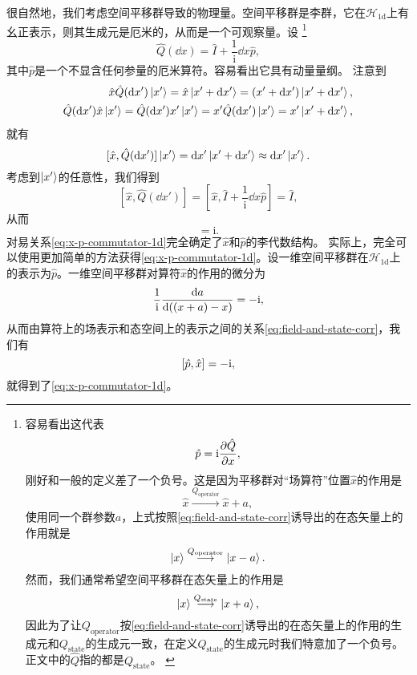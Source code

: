 \documentclass[hyperref, UTF8, a4paper]{ctexart}
\newcommand*{\ii}{\mathrm{i}}
\begin{document}
很自然地，我们考虑空间平移群导致的物理量。空间平移群是李群，它在$\mathcal{H}_{1\text{d}}$上有幺正表示，则其生成元是厄米的，从而是一个可观察量。设%
\footnote{容易看出这代表
\[
    \hat{p} = \ii \pdv{\hat{Q}}{x},
\]
刚好和一般的定义差了一个负号。这是因为平移群对“场算符”位置$\hat{x}$的作用是
\[
    \hat{x} \stackrel{Q_\text{operator}}{\longrightarrow} \hat{x} + a,
\]
使用同一个群参数$a$，上式按照\eqref{eq:field-and-state-corr}诱导出的在态矢量上的作用就是
\[
    \ket{x} \stackrel{Q_\text{operator}}{\longrightarrow} \ket{x - a}.
\]
然而，我们通常希望空间平移群在态矢量上的作用是
\[
    \ket{x} \stackrel{Q_\text{state}}{\longrightarrow} \ket{x + a},
\]
因此为了让$Q_\text{operator}$按\eqref{eq:field-and-state-corr}诱导出的在态矢量上的作用的生成元和$Q_\text{state}$的生成元一致，在定义$Q_\text{state}$的生成元时我们特意加了一个负号。正文中的$\hat{Q}$指的都是$Q_\text{state}$。
\label{note:state-and-operator-minus-symbol}}
\begin{equation}
    \hat{Q}(\dd{x}) = \hat{I} + \frac{1}{\ii} \dd{x} \hat{p},
\end{equation}
其中$\hat{p}$是一个不显含任何参量的厄米算符。容易看出它具有动量量纲。
注意到
\[
    \begin{split}
        \hat{x} \hat{Q}(\dd{x'}) \ket{x'} = \hat{x} \ket{x' + \dd{x'}} = (x' + \dd{x'}) \ket{x' + \dd{x'}}, \\
        \hat{Q}(\dd{x'}) \hat{x} \ket{x'} = \hat{Q}(\dd{x'}) x' \ket{x'} = x' \hat{Q}(\dd{x'}) \ket{x'} = x' \ket{x' + \dd{x'}},
    \end{split}
\]
就有
\[
    [\hat{x}, \hat{Q}(\dd{x'})] \ket{x'} = \dd{x'} \ket{x' + \dd{x'}} \approx \dd{x'} \ket{x'}.
\]
考虑到$\ket{x'}$的任意性，我们得到
\[
    [\hat{x}, \hat{Q}(\dd{x'})] = \left[\hat{x}, \hat{I} + \frac{1}{\ii} \dd{x} \hat{p}\right] = \hat{I},
\]
从而
\begin{equation}
    [\hat{x}, \hat{p}] = \ii . 
    \label{eq:x-p-commutator-1d}   
\end{equation}
对易关系\eqref{eq:x-p-commutator-1d}完全确定了$\hat{x}$和$\hat{p}$的李代数结构。
实际上，完全可以使用更加简单的方法获得\eqref{eq:x-p-commutator-1d}。设一维空间平移群在$\mathcal{H}_\text{1d}$上的表示为$\hat{p}$。一维空间平移群对算符$\hat{x}$的作用的微分为
\[
    \frac{1}{\ii} \dv{a} {((x + a) - x)} = - \ii,
\]
从而由算符上的场表示和态空间上的表示之间的关系\eqref{eq:field-and-state-corr}，我们有
\[
    \comm{\hat{p}}{\hat{x}} = - \ii,
\]
就得到了\eqref{eq:x-p-commutator-1d}。
\end{document}
